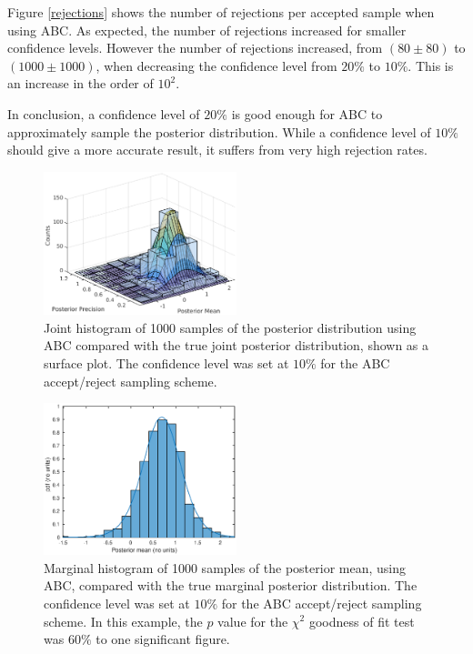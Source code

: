\documentclass[a4paper]{proc}
\begin{document}
Figure \ref{rejections} shows the number of rejections per accepted sample when using ABC. As expected, the number of rejections increased for smaller confidence levels. However the number of rejections increased, from $(80\pm80)$ to $(1000\pm1000)$, when decreasing the confidence level from $20\%$ to $10\%$. This is an increase in the order of $10^2$.

In conclusion, a confidence level of $20\%$ is good enough for ABC to approximately sample the posterior distribution. While a confidence level of $10\%$ should give a more accurate result, it suffers from very high rejection rates.

\begin{figure}
\includegraphics[width=0.5\textwidth]{surf.eps}
\caption{Joint histogram of 1000 samples of the posterior distribution using ABC compared with the true joint posterior distribution, shown as a surface plot. The confidence level was set at $10\%$ for the ABC accept/reject sampling scheme.}
\label{surf}
\end{figure}

\begin{figure}
\includegraphics[width=0.5\textwidth]{mean.eps}
\caption{Marginal histogram of 1000 samples of the posterior mean, using ABC, compared with the true marginal posterior distribution. The confidence level was set at $10\%$ for the ABC accept/reject sampling scheme. In this example, the $p$ value for the $\chi^2$ goodness of fit test was $60\%$ to one significant figure.}
\label{mean}
\end{figure}
\end{document}
